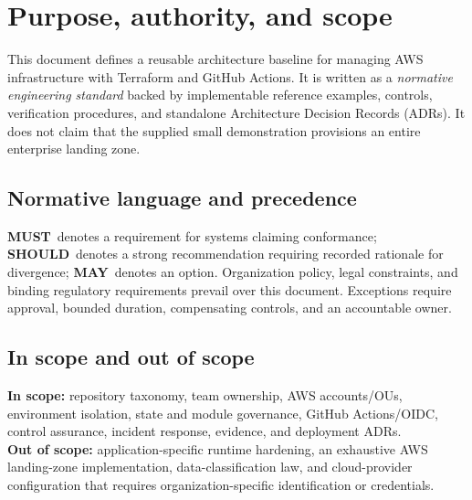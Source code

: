 \documentclass[10pt,letterpaper]{article}
\newcommand{\must}{\textbf{MUST}}
\newcommand{\should}{\textbf{SHOULD}}
\newcommand{\may}{\textbf{MAY}}
\begin{document}
\section{Purpose, authority, and scope}
This document defines a reusable architecture baseline for managing AWS infrastructure with Terraform and GitHub Actions. It is written as a \emph{normative engineering standard} backed by implementable reference examples, controls, verification procedures, and standalone Architecture Decision Records (ADRs). It does not claim that the supplied small demonstration provisions an entire enterprise landing zone.

\subsection{Normative language and precedence}
\must\ denotes a requirement for systems claiming conformance; \should\ denotes a strong recommendation requiring recorded rationale for divergence; \may\ denotes an option. Organization policy, legal constraints, and binding regulatory requirements prevail over this document. Exceptions require approval, bounded duration, compensating controls, and an accountable owner.

\subsection{In scope and out of scope}
\textbf{In scope:} repository taxonomy, team ownership, AWS accounts/OUs, environment isolation, state and module governance, GitHub Actions/OIDC, control assurance, incident response, evidence, and deployment ADRs.\\
\textbf{Out of scope:} application-specific runtime hardening, an exhaustive AWS landing-zone implementation, data-classification law, and cloud-provider configuration that requires organization-specific identification or credentials.
\end{document}
